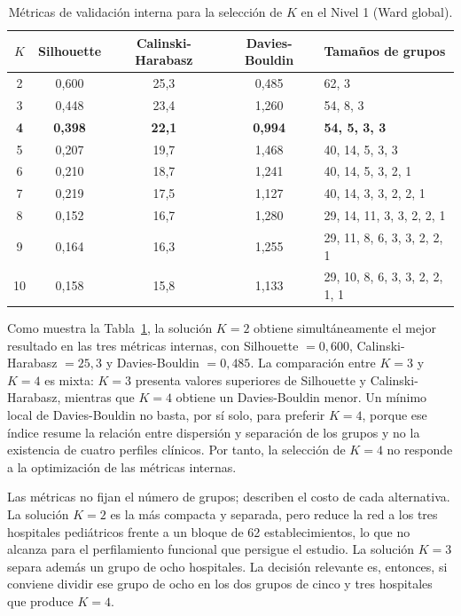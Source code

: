 \begin{table}[htbp]
\centering
\caption{Métricas de validación interna para la selección de $K$ en el Nivel 1
(Ward global).}
\label{tab:metricas-nivel1}
\begin{tabular}{c c c c l}
\toprule
\textbf{$K$} & \textbf{Silhouette} & \textbf{Calinski-Harabasz} &
\textbf{Davies-Bouldin} & \textbf{Tamaños de grupos} \\
\midrule
2 & 0,600 & 25,3 & 0,485 & 62, 3 \\
3 & 0,448 & 23,4 & 1,260 & 54, 8, 3 \\
\bfseries 4 & \bfseries 0,398 & \bfseries 22,1 & \bfseries 0,994 &
\bfseries 54, 5, 3, 3 \\
5 & 0,207 & 19,7 & 1,468 & 40, 14, 5, 3, 3 \\
6 & 0,210 & 18,7 & 1,241 & 40, 14, 5, 3, 2, 1 \\
7 & 0,219 & 17,5 & 1,127 & 40, 14, 3, 3, 2, 2, 1 \\
8 & 0,152 & 16,7 & 1,280 & 29, 14, 11, 3, 3, 2, 2, 1 \\
9 & 0,164 & 16,3 & 1,255 & 29, 11, 8, 6, 3, 3, 2, 2, 1 \\
10 & 0,158 & 15,8 & 1,133 & 29, 10, 8, 6, 3, 3, 2, 2, 1, 1 \\
\bottomrule
\end{tabular}
\end{table}

Como muestra la Tabla~\ref{tab:metricas-nivel1}, la solución $K=2$ obtiene simultáneamente el mejor resultado en las tres
métricas internas, con Silhouette $=0{,}600$, Calinski-Harabasz $=25{,}3$ y
Davies-Bouldin $=0{,}485$. La
comparación entre $K=3$ y $K=4$ es mixta: $K=3$ presenta valores superiores de
Silhouette y Calinski-Harabasz, mientras que $K=4$ obtiene un Davies-Bouldin
menor. Un mínimo local de Davies-Bouldin no basta, por sí solo, para preferir
$K=4$, porque ese índice resume la relación entre dispersión y separación de los
grupos y no la existencia de cuatro perfiles clínicos. Por tanto, la selección de
$K=4$ no responde a la optimización de las métricas internas.

Las métricas no fijan el número de grupos; describen el costo de cada
alternativa. La solución $K=2$ es la más compacta y separada, pero
reduce la red a los tres hospitales pediátricos frente a un bloque de 62
establecimientos, lo que no alcanza para el perfilamiento funcional que persigue
el estudio. La solución $K=3$ separa además un grupo de ocho hospitales. La
decisión relevante es, entonces, si conviene dividir ese grupo de ocho en los
dos grupos de cinco y tres hospitales que produce $K=4$.

